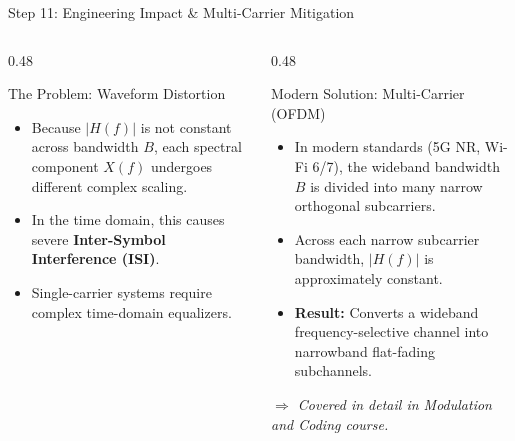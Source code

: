 \documentclass[10pt,aspectratio=169]{beamer}
\begin{document}
\begin{frame}{Step 11: Engineering Impact \& Multi-Carrier Mitigation}
  \begin{columns}[T]
    \begin{column}{0.48\textwidth}
      \begin{alertblock}{The Problem: Waveform Distortion}
        \begin{itemize}
          \item Because $|H(f)|$ is not constant across bandwidth $B$, each spectral component $X(f)$ undergoes different complex scaling.
          \item In the time domain, this causes severe \textbf{Inter-Symbol Interference (ISI)}.
          \item Single-carrier systems require complex time-domain equalizers.
        \end{itemize}
      \end{alertblock}
    \end{column}

    \begin{column}{0.48\textwidth}
      \begin{exampleblock}{Modern Solution: Multi-Carrier (OFDM)}
        \begin{itemize}
          \item In modern standards (5G NR, Wi-Fi 6/7), the wideband bandwidth $B$ is divided into many narrow orthogonal subcarriers.
          \item Across each narrow subcarrier bandwidth, $|H(f)|$ is approximately constant.
          \item \textbf{Result:} Converts a wideband frequency-selective channel into narrowband flat-fading subchannels.
        \end{itemize}
        \textit{$\Rightarrow$ Covered in detail in Modulation and Coding course.}
      \end{exampleblock}
    \end{column}
  \end{columns}
\end{frame}
\end{document}
